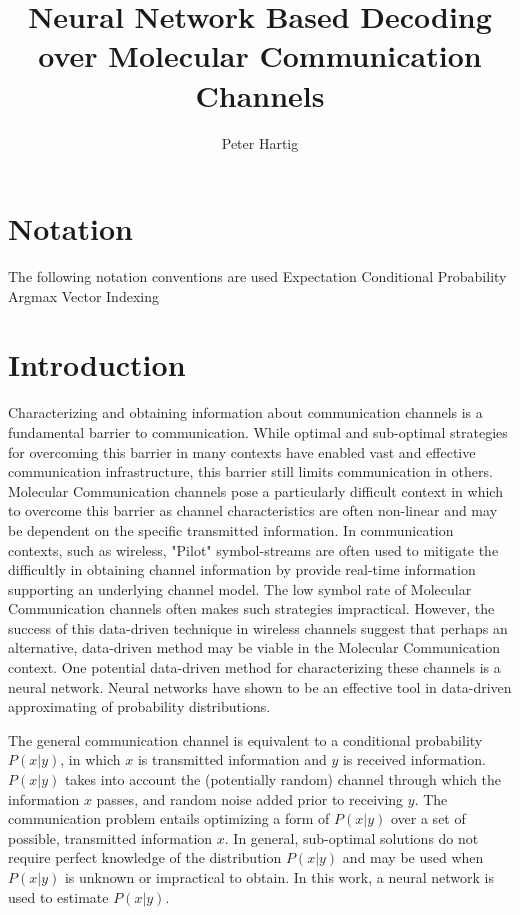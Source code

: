 \documentclass[12pt,a4paper]{report}
\title{Neural Network Based Decoding over Molecular Communication Channels}
\author{Peter Hartig}
\begin{document}
\maketitle

\begin{abstract}

\end{abstract}

\newpage
\tableofcontents
\newpage
\section{Notation}
The following notation conventions are used 
Expectation
Conditional Probability 
Argmax
Vector Indexing

\section{Introduction}
Characterizing and obtaining information about communication channels is a fundamental barrier to communication. While optimal and sub-optimal strategies for overcoming this barrier in many contexts have enabled vast and effective communication infrastructure, this barrier still limits communication in others. Molecular Communication channels pose a particularly difficult context in which to overcome this barrier as channel characteristics are often non-linear and may be dependent on the specific transmitted information.
In communication contexts, such as wireless, "Pilot" symbol-streams are often used to mitigate the difficultly in obtaining channel information by provide real-time information supporting an underlying channel model. The low symbol rate of Molecular Communication channels often makes such strategies impractical. However, the success of this data-driven technique in wireless channels suggest that perhaps an alternative, data-driven method may be viable in the Molecular Communication context. One potential data-driven method for characterizing these channels is a neural network. Neural networks have shown to be an effective tool in data-driven approximating of probability distributions.
\par

The general communication channel is equivalent to a conditional probability $P(x|y)$, in which $x$ is transmitted information and $y$ is received information.  $P(x|y)$ takes into account the (potentially random) channel through which the information $x$ passes, and random noise added prior to receiving $y$. The communication problem entails optimizing a form of $P(x|y)$ over a set of possible, transmitted information $x$. In general, sub-optimal solutions do not require perfect knowledge of the distribution $P(x|y)$ and may be used when $P(x|y)$ is unknown or impractical to obtain. In this work, a neural network is used to estimate $P(x|y)$.
\end{document}

